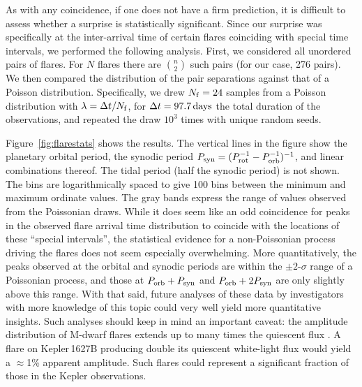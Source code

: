 \documentclass[12pt,modern,twocolumn,tighten]{aastex63}
\begin{document}
As with any coincidence, if one does not have a firm prediction, it is
difficult to assess whether a surprise is statistically significant.
Since our surprise was specifically at the inter-arrival time of
certain flares coinciding with special time intervals, we performed
the following analysis.  First, we considered all unordered pairs of
flares.  For $N$ flares there are ${n \choose 2}$ such pairs (for our
case, 276 pairs).  We then compared the distribution of the pair
separations against that of a Poisson distribution.  Specifically, we
drew $N_{\rm f}=24$ samples from a Poisson distribution with $\lambda
= \Delta t / N_{\rm f}$, for $\Delta t=97.7\,{\rm days}$ the total
duration of the observations, and repeated the draw $10^3$ times with
unique random seeds.

Figure~\ref{fig:flarestats} shows the results.  The vertical lines in
the figure show the planetary orbital period, the synodic period
$P_{\rm syn} = (P_{\rm rot}^{-1} - P_{\rm orb}^{-1})^{-1}$, and linear
combinations thereof.  The tidal period (half the synodic period) is
not shown.  The bins are logarithmically spaced to give 100 bins
between the minimum and maximum ordinate values.  The gray bands
express the range of values observed from the Poissonian draws.  While
it does seem like an odd coincidence for peaks in the observed flare
arrival time distribution to coincide with the locations of these
``special intervals'', the statistical evidence for a non-Poissonian
process driving the flares does not seem especially overwhelming.
More quantitatively, the peaks observed at the orbital and synodic
periods are within the $\pm 2$-$\sigma$ range of a Poissonian process,
and those at $P_{\rm orb}+P_{\rm syn}$ and $P_{\rm orb}+2P_{\rm syn}$
are only slightly above this range.  With that said, future analyses
of these data by investigators with more knowledge of this topic could
very well yield more quantitative insights.  Such analyses should keep
in mind an important caveat: the amplitude distribution of M-dwarf
flares extends up to many times the quiescent flux \citep[see Figure~7
of][]{gunther_2020}.  A flare on Kepler\,1627B producing double its
quiescent white-light flux would yield a $\approx$1\% apparent
amplitude.  Such flares could represent a significant fraction of
those in the Kepler observations.





\listofchanges

\end{document}
